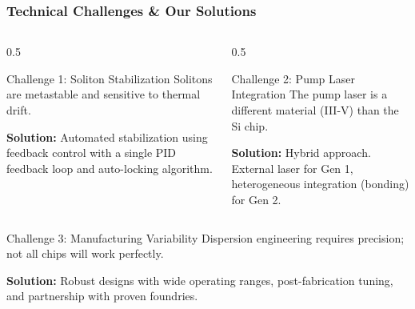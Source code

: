 \documentclass{beamer}
\begin{document}
\begin{frame}
    \frametitle{Technical Challenges \& Our Solutions}
    
    \begin{columns}[T]
        \begin{column}{0.5\textwidth}
            \begin{alertblock}{Challenge 1: Soliton Stabilization}
                Solitons are metastable and sensitive to thermal drift.
            \end{alertblock}
            \textbf{Solution:} Automated stabilization using feedback control with a single PID feedback loop and auto-locking algorithm.
        \end{column}
        \begin{column}{0.5\textwidth}
            \begin{alertblock}{Challenge 2: Pump Laser Integration}
                The pump laser is a different material (III-V) than the Si chip.
            \end{alertblock}
            \textbf{Solution:} Hybrid approach. External laser for Gen 1, heterogeneous integration (bonding) for Gen 2.
        \end{column}
    \end{columns}
    
    \begin{alertblock}{Challenge 3: Manufacturing Variability}
        Dispersion engineering requires precision; not all chips will work perfectly.
    \end{alertblock}
    \textbf{Solution:} Robust designs with wide operating ranges, post-fabrication tuning, and partnership with proven foundries.
\end{frame}
\end{document}
